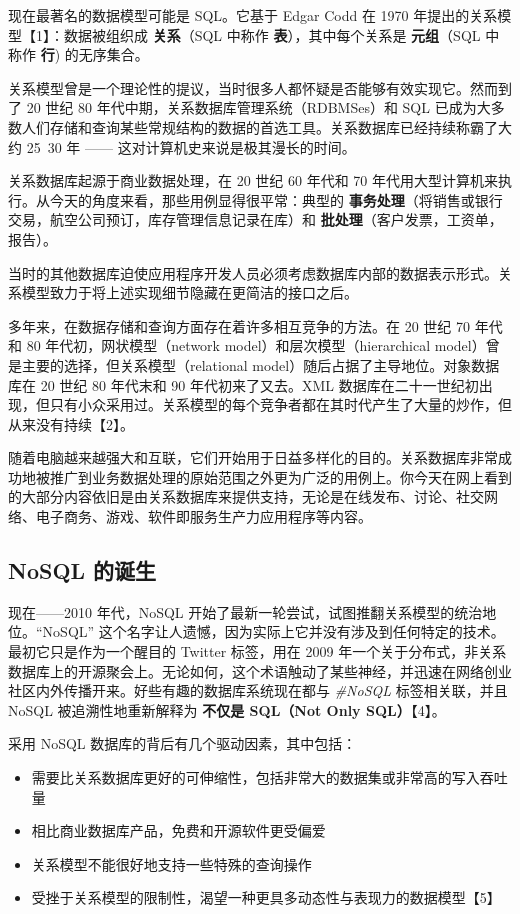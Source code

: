 现在最著名的数据模型可能是 SQL。它基于 Edgar Codd 在 1970 年提出的关系模型【1】：数据被组织成 \textbf{关系}（SQL 中称作 \textbf{表}），其中每个关系是 \textbf{元组}（SQL 中称作 \textbf{行}) 的无序集合。

关系模型曾是一个理论性的提议，当时很多人都怀疑是否能够有效实现它。然而到了 20 世纪 80 年代中期，关系数据库管理系统（RDBMSes）和 SQL 已成为大多数人们存储和查询某些常规结构的数据的首选工具。关系数据库已经持续称霸了大约 25~30 年 —— 这对计算机史来说是极其漫长的时间。

关系数据库起源于商业数据处理，在 20 世纪 60 年代和 70 年代用大型计算机来执行。从今天的角度来看，那些用例显得很平常：典型的 \textbf{事务处理}（将销售或银行交易，航空公司预订，库存管理信息记录在库）和 \textbf{批处理}（客户发票，工资单，报告）。

当时的其他数据库迫使应用程序开发人员必须考虑数据库内部的数据表示形式。关系模型致力于将上述实现细节隐藏在更简洁的接口之后。

多年来，在数据存储和查询方面存在着许多相互竞争的方法。在 20 世纪 70 年代和 80 年代初，网状模型（network model）和层次模型（hierarchical model）曾是主要的选择，但关系模型（relational model）随后占据了主导地位。对象数据库在 20 世纪 80 年代末和 90 年代初来了又去。XML 数据库在二十一世纪初出现，但只有小众采用过。关系模型的每个竞争者都在其时代产生了大量的炒作，但从来没有持续【2】。

随着电脑越来越强大和互联，它们开始用于日益多样化的目的。关系数据库非常成功地被推广到业务数据处理的原始范围之外更为广泛的用例上。你今天在网上看到的大部分内容依旧是由关系数据库来提供支持，无论是在线发布、讨论、社交网络、电子商务、游戏、软件即服务生产力应用程序等内容。

\subsection{NoSQL 的诞生}

现在——2010 年代，NoSQL 开始了最新一轮尝试，试图推翻关系模型的统治地位。“NoSQL” 这个名字让人遗憾，因为实际上它并没有涉及到任何特定的技术。最初它只是作为一个醒目的 Twitter 标签，用在 2009 年一个关于分布式，非关系数据库上的开源聚会上。无论如何，这个术语触动了某些神经，并迅速在网络创业社区内外传播开来。好些有趣的数据库系统现在都与 \textit{\#NoSQL} 标签相关联，并且 NoSQL 被追溯性地重新解释为 \textbf{不仅是 SQL（Not Only SQL）}【4】。

采用 NoSQL 数据库的背后有几个驱动因素，其中包括：

\begin{itemize}
    \item 需要比关系数据库更好的可伸缩性，包括非常大的数据集或非常高的写入吞吐量
    \item 相比商业数据库产品，免费和开源软件更受偏爱
    \item 关系模型不能很好地支持一些特殊的查询操作
    \item 受挫于关系模型的限制性，渴望一种更具多动态性与表现力的数据模型【5】
\end{itemize}

